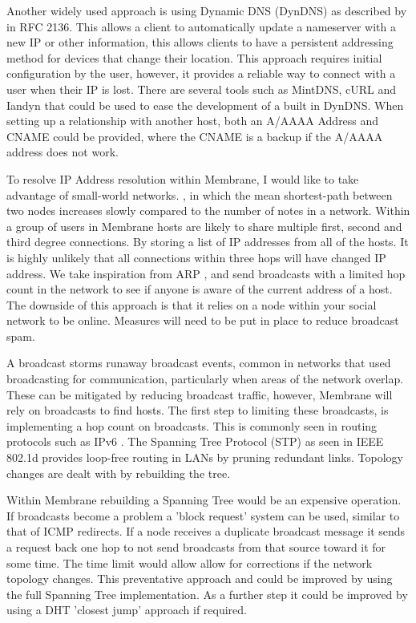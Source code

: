 \documentclass[a4paper, 11pt, twocolumn, twoside]{report}
\begin{document}
Another widely used approach is using Dynamic DNS (DynDNS) as described by \cite{bound1997dynamic} in RFC 2136. This allows a client to automatically update a nameserver with a new IP or other information, this allows clients to have a persistent addressing method for devices that change their location. This approach requires initial configuration by the user, however, it provides a reliable way to connect with a user when their IP is lost. There are several tools such as MintDNS, cURL and Iandyn that could be used to ease the development of a built in DynDNS. When setting up a relationship with another host, both an A/AAAA Address and CNAME could be provided, where the CNAME is a backup if the A/AAAA address does not work.

To resolve IP Address resolution within Membrane, I would like to take advantage of small-world networks. \citep{porter2012small}, in which the mean shortest-path between two nodes increases slowly compared to the number of notes in a network. Within a group of users in Membrane hosts are likely to share multiple first, second and third degree connections. By storing a list of IP addresses from all of the hosts. It is highly unlikely that all connections within three hops will have changed IP address. We take inspiration from ARP \citep{plummer1982ethernet}, and send broadcasts with a limited hop count in the network to see if anyone is aware of the current address of a host. The downside of this approach is that it relies on a node within your social network to be online. Measures will need to be put in place to reduce broadcast spam.

A broadcast storms runaway broadcast events, common in networks that used broadcasting for communication, particularly when areas of the network overlap. \citep{Tseng:2002:BSP:506900.506905} These can be mitigated by reducing broadcast traffic, however, Membrane will rely on broadcasts to find hosts. The first step to limiting these broadcasts, is implementing a hop count on broadcasts. This is commonly seen in routing protocols such as IPv6 \citep{deering1998internet}. The Spanning Tree Protocol (STP) as seen in IEEE 802.1d \citep*{ieee802ieee, sharma2004viking} provides loop-free routing in LANs by pruning redundant links. Topology changes are dealt with by rebuilding the tree.

Within Membrane rebuilding a Spanning Tree would be an expensive operation. If broadcasts become a problem a 'block request' system can be used, similar to that of ICMP redirects. \citep{postel1981rfc} If a node receives a duplicate broadcast message it sends a request back one hop to not send broadcasts from that source toward it for  some time. The time limit would allow allow for corrections if the network topology changes. This preventative approach and could be improved by using the full Spanning Tree implementation. As a further step it could be improved by using a DHT 'closest jump' approach if required.
\end{document}

